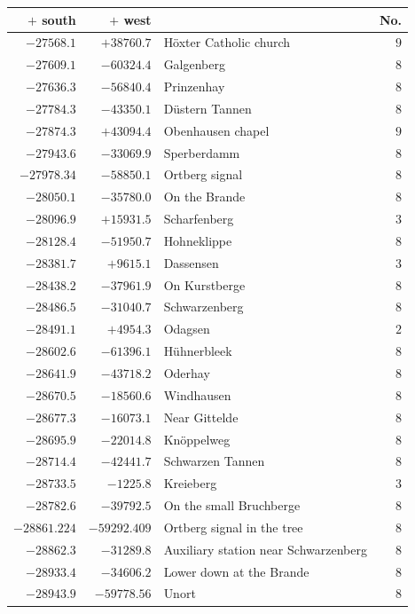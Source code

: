 \clearpage{}%
\begin{center}\begingroup\fontsize{8}{9}\selectfont
\setlength{\tabcolsep}{4pt}
\begin{tabular}{r|r|p{170pt}|r}\hline
\(+\) south&\(+\) west&&No.\\\hline
\(-27568.1\)&\(+38760.7\)&Höxter Catholic church&\(9\)\\
\(-27609.1\)&\(-60324.4\)&Galgenberg&\(8\)\\
\(-27636.3\)&\(-56840.4\)&Prinzenhay&\(8\)\\
\(-27784.3\)&\(-43350.1\)&Düstern Tannen&\(8\)\\
\(-27874.3\)&\(+43094.4\)&Obenhausen chapel&\(9\)\\
\(-27943.6\)&\(-33069.9\)&Sperberdamm&\(8\)\\
\(-27978.34\)&\(-58850.1\)&Ortberg signal&\(8\)\\
\(-28050.1\)&\(-35780.0\)&On the Brande&\(8\)\\
\(-28096.9\)&\(+15931.5\)&Scharfenberg&\(3\)\\
\(-28128.4\)&\(-51950.7\)&Hohneklippe&\(8\)\\
\(-28381.7\)&\(+9615.1\)&Dassensen&\(3\)\\
\(-28438.2\)&\(-37961.9\)&On Kurstberge&\(8\)\\
\(-28486.5\)&\(-31040.7\)&Schwarzenberg&\(8\)\\
\(-28491.1\)&\(+4954.3\)&Odagsen&\(2\)\\
\(-28602.6\)&\(-61396.1\)&Hühnerbleek&\(8\)\\
\(-28641.9\)&\(-43718.2\)&Oderhay&\(8\)\\
\(-28670.5\)&\(-18560.6\)&Windhausen&\(8\)\\
\(-28677.3\)&\(-16073.1\)&Near Gittelde&\(8\)\\
\(-28695.9\)&\(-22014.8\)&Knöppelweg&\(8\)\\
\(-28714.4\)&\(-42441.7\)&Schwarzen Tannen&\(8\)\\
\(-28733.5\)&\(-1225.8\)&Kreieberg&\(3\)\\
\(-28782.6\)&\(-39792.5\)&On the small Bruchberge&\(8\)\\
\(-28861.224\)&\(-59292.409\)&Ortberg signal in the tree&\(8\)\\
\(-28862.3\)&\(-31289.8\)&Auxiliary station near Schwarzenberg&\(8\)\\
\(-28933.4\)&\(-34606.2\)&Lower down at the Brande&\(8\)\\
\(-28943.9\)&\(-59778.56\)&Unort&\(8\)\\

\end{tabular}
\end{center}
